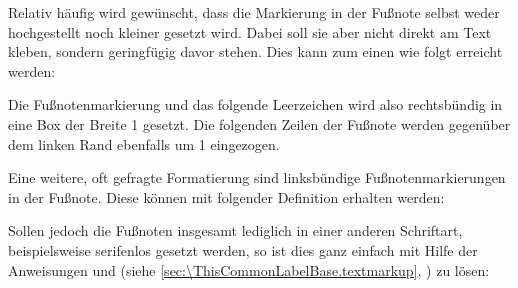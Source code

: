 \IfThisCommonFirstRun{\iftrue}{\csname iffalse\endcsname}%
  \begin{Example}
    Relativ häufig wird gewünscht, dass die Markierung in der
    Fußnote selbst weder hochgestellt noch kleiner gesetzt wird. Dabei soll
    sie aber nicht direkt am Text kleben, sondern geringfügig davor
    stehen. Dies kann zum einen wie folgt erreicht werden:
\begin{lstcode}
\end{lstcode}
    Die Fußnotenmarkierung und das folgende Leerzeichen wird also rechtsbündig
    in eine Box der Breite 1 gesetzt.  Die folgenden Zeilen der
    Fußnote werden gegenüber dem linken Rand ebenfalls um 1
    eingezogen.
  
    Eine weitere, oft gefragte Formatierung sind linksbündige
    Fußnotenmarkierungen in der Fußnote. Diese können mit folgender Definition
    erhalten werden:
\begin{lstcode}
\end{lstcode}
  
    Sollen jedoch die Fußnoten insgesamt lediglich in einer anderen
    Schriftart, beispielsweise serifenlos gesetzt werden, so ist dies ganz
    einfach mit Hilfe der Anweisungen
     und
     (siehe
    \autoref{sec:\ThisCommonLabelBase.textmarkup},
    ) zu lösen:
\begin{lstcode}
\end{lstcode}%
  \end{Example}%
\fi%
%
%
\EndIndexGroup
\EndIndexGroup

